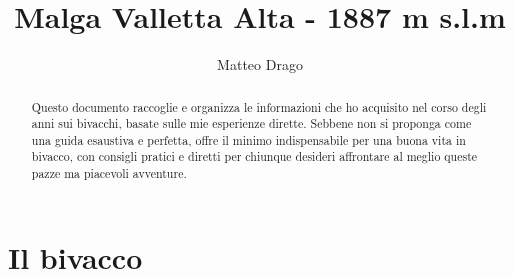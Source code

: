 \documentclass{article}
\title{\textbf{Malga Valletta Alta - 1887 m s.l.m}}
\author{Matteo Drago}
\begin{document}
\maketitle
\thispagestyle{fancy} %

\begin{abstract}
Questo documento raccoglie e organizza le informazioni che ho acquisito nel corso degli anni sui bivacchi, basate sulle mie esperienze dirette. Sebbene non si proponga come una guida esaustiva e perfetta, offre il minimo indispensabile per una buona vita in bivacco, con consigli pratici e diretti per chiunque desideri affrontare al meglio queste pazze ma piacevoli avventure.
\end{abstract}

\section{Il bivacco}
\end{document}
